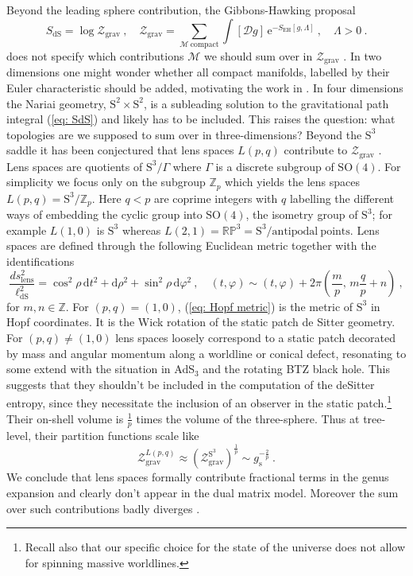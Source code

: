 \documentclass[12pt,a4paper]{article}
\newcommand{\be}{\begin{equation}}
\newcommand{\ee}{\end{equation}}
\newcommand\SO{\text{SO}}
\renewcommand\d{\text{d}}
\begin{document}
Beyond the leading sphere contribution, the Gibbons-Hawking proposal 
\begin{equation}\label{eq: SdS_discussion}
    S_{\mathrm{dS}} = \log \mathcal{Z}_{\mathrm{grav}}~,\quad \mathcal{Z}_{\mathrm{grav}} = \sum_{\mathcal{M} ~\mathrm{compact}}\int [\mathcal{D}g]\,\mathrm{e}^{-S_{\mathrm{EH}}[g,\Lambda]}~,\quad \Lambda >0~.
\end{equation}
does not specify which contributions $\mathcal{M}$ we should sum over in $\mathcal{Z}_{\mathrm{grav}}$ \cite{Anninos:2022ujl}. In two dimensions one might wonder whether all compact manifolds, labelled by their Euler characteristic should be added, motivating the work in \cite{Anninos:2021eit, Anninos:2022ujl}. In four dimensions the Nariai geometry, $\text{S}^2 \times \text{S}^2$, \cite{Volkov:2000ih} is a subleading solution to the gravitational path integral (\ref{eq: SdS}) and likely has to be included. This raises the question: what topologies are we supposed to sum over in three-dimensions? Beyond the $\text{S}^3$ saddle it has been conjectured that lens spaces $L(p,q)$ contribute to $\mathcal{Z}_{\mathrm{grav}}$ \cite{Castro:2011xb}. Lens spaces are quotients of $\text{S}^3/\Gamma$ where $\Gamma$ is a discrete subgroup of $\SO(4)$. For simplicity we focus only on the subgroup $\mathbb{Z}_p$ which yields the lens spaces $L(p,q) = \text{S}^3/\mathbb{Z}_p$. Here $q<p$ are coprime integers with $q$ labelling the different ways of embedding the cyclic group into $\SO(4)$, the isometry group of $\text{S}^3$; for example $L(1,0)$ is $\text{S}^3$ whereas $L(2,1) = \mathbb{RP}^3 = \text{S}^3/\mathrm{antipodal~points}$. Lens spaces are defined through the following Euclidean metric together with the identifications
\begin{equation}\label{eq: Hopf metric}
    \frac{ds_{\mathrm{lens}}^2}{\ell_{\mathrm{dS}}^2} = \cos^2\rho\, \d t^2 + \d\rho^2 + \sin^2\rho\,  \d\varphi^2~,\quad (t,\varphi) \sim (t,\varphi) + 2\pi\left(\frac{m}{p},\, m\frac{q}{p}+n\right)~,
\end{equation}
for $m,n\in \mathbb{Z}$. For $(p,q)=(1,0)$, (\ref{eq: Hopf metric}) is the metric of $\text{S}^3$ in Hopf coordinates. It is the Wick rotation of the static patch de Sitter geometry. For $(p,q)\neq (1,0)$ lens spaces loosely correspond to a static patch decorated by mass and angular momentum along a worldline or conical defect, resonating to some extend with the situation in AdS$_3$ and the rotating BTZ black hole. This suggests that they shouldn't be included in the computation of the deSitter entropy, since they necessitate the inclusion of an observer in the static patch.\footnote{Recall also that our specific choice for the state of the universe does not allow for spinning massive worldlines.} Their on-shell volume is $\frac{1}{p}$ times the volume of the three-sphere. Thus at tree-level, their partition functions scale like
\be 
\mathcal{Z}_\text{grav}^{L(p,q)} \approx \left(\mathcal{Z}_\text{grav}^{\text{S}^3}\right)^{\frac{1}{p}} \sim g_\text{s}^{-\frac{2}{p}}~ .
\ee
We conclude that lens spaces formally contribute fractional terms in the genus expansion and clearly don't appear in the dual matrix model. Moreover the sum over such contributions badly diverges \cite{Castro:2011xb}.
\end{document}
